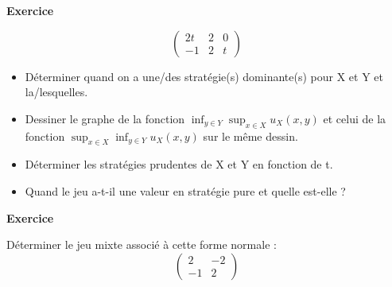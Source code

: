\documentclass[11pt]{scrartcl}
\begin{document}
\begin{center}
\textbf{Exercice}
\end{center}

\begin{equation*}
\begin{pmatrix}
2t&2&0\\
-1&2&t
\end{pmatrix}
\end{equation*}

\begin{itemize}
\item D\'eterminer quand on a une/des strat\'egie(s) dominante(s) pour X et Y et la/lesquelles.
\item Dessiner le graphe de la fonction $\inf_{y \in Y} \sup_{x \in X} u_X(x,y)$ et celui de 
la fonction $ \sup_{x \in X} \inf_{y \in Y} u_X(x,y)$ sur le m\^eme dessin.
\item D\'eterminer les strat\'egies prudentes de X et Y en fonction de t.
\item Quand le jeu a-t-il une valeur en strat\'egie pure et quelle est-elle ?
\end{itemize}

\begin{center}
\textbf{Exercice}
\end{center}

D\'eterminer le jeu mixte associ\'e \`a cette forme normale :
\begin{equation*}
\begin{pmatrix}
2&-2\\
-1&2
\end{pmatrix}
\end{equation*}
\end{document}
